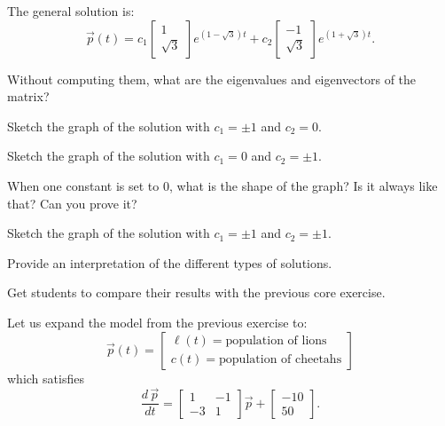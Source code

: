 	The general solution is:
	$$
	\vec{p}(t) = c_1 \begin{bmatrix} 1 \\ \sqrt{3} \end{bmatrix} e^{(1-\sqrt{3})t} + c_2 \begin{bmatrix} -1 \\ \sqrt{3} \end{bmatrix} e^{(1+\sqrt{3})t}.
	$$
\begin{parts}
	\item Without computing them, what are the eigenvalues and eigenvectors of the matrix?
	\item Sketch the graph of the solution with $c_1=\pm 1$ and $c_2=0$.
	\item Sketch the graph of the solution with $c_1=0$ and $c_2=\pm 1$.
	\item When one constant is set to 0, what is the shape of the graph? Is it always like that? Can you prove it?
	\item Sketch the graph of the solution with $c_1=\pm 1$ and $c_2=\pm 1$.
	\item Provide an interpretation of the different types of solutions.
\end{parts}






\bookonlynewpage

\begin{annotation}
	\begin{goals}
		Get students to compare their results with the previous core exercise.
%
	\end{goals}
\end{annotation}
\question
	Let us expand the model from the previous exercise to:
	$$ \vec{p}(t) = \begin{bmatrix} \ell(t) = \text{population of lions} \\ c(t) = \text{population of cheetahs} \end{bmatrix} $$
	which satisfies
	$$
	\frac{d\,\vec{p}}{dt} = \begin{bmatrix}
 		1 & -1 \\
 		-3 & 1
 	\end{bmatrix} \vec{p}
 	+ \begin{bmatrix}
 		- 10 \\ 50
	 \end{bmatrix}.
	$$
	
